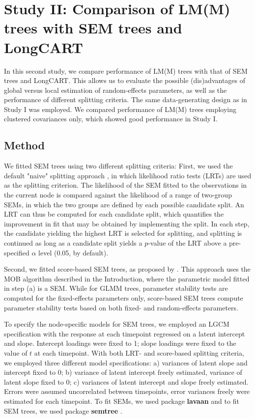 \documentclass[doc,floatsintext,natbib]{apa7}
\begin{document}
\section{Study II: Comparison of LM(M) trees with SEM trees and LongCART}

In this second study, we compare performance of LM(M) trees with that of SEM trees and LongCART. This allows us to evaluate the possible (dis)advantages of global versus local estimation of random-effects parameters, as well as the performance of different splitting criteria. The same data-generating design as in Study I was employed. We compared performance of LM(M) trees employing clustered covariances only, which showed good performance in Study I.

\subsection{Method}

We fitted SEM trees using two different splitting criteria: First, we used the default "naive" splitting approach \citep{BranyOert13}, in which likelihood ratio tests (LRTs) are used as the splitting criterion. The likelihood of the SEM fitted to the observations in the current node is compared against the likelihood of a range of two-group SEMs, in which the two groups are defined by each possible candidate split. An LRT can thus be computed for each candidate split, which quantifies the improvement in fit that may be obtained by implementing the split. In each step, the candidate yielding the highest LRT is selected for splitting, and splitting is continued as long as a candidate split yields a $p$-value of the LRT above a pre-specified $\alpha$ level (0.05, by default). 

Second, we fitted score-based SEM trees, as proposed by \cite{ArnoyVoel21}. This approach uses the MOB algorithm described in the Introduction, where the parametric model fitted in step (a) is a SEM. While for GLMM trees, parameter stability tests are computed for the fixed-effects parameters only, score-based SEM trees compute parameter stability tests based on both fixed- and random-effects parameters. 

To specify the node-specific models for SEM trees, we employed an LGCM specification with the response at each timepoint regressed on a latent intercept and slope. Intercept loadings were fixed to 1; slope loadings were fixed to the value of $t$ at each timepoint. With both LRT- and score-based splitting criteria, we employed three different model specifications: a) variances of latent slope and intercept fixed to 0; b) variance of latent intercept freely estimated, variance of latent slope fixed to 0; c) variances of latent intercept and slope freely estimated. Errors were assumed uncorrelated between timepoints, error variances freely were estimated for each timepoint. To fit SEMs, we used package \textbf{lavaan} \citep[version 0.6-11][]{Ross12} and to fit SEM trees, we used package \textbf{semtree} \citep[version 0.9.17][]{BranyOert13}.    
\end{document}
